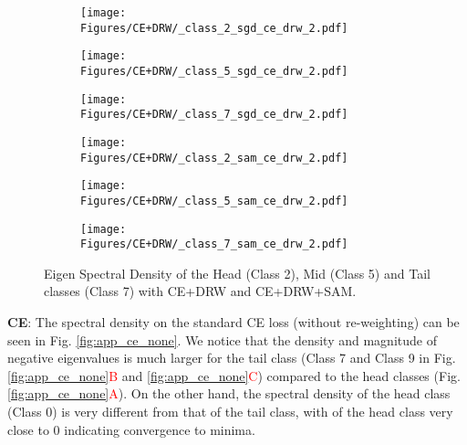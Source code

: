 \documentclass{article}
\begin{document}
\begin{figure}[t]
\begin{subfigure}{.33\textwidth}
  \centering
  \texttt{[image: Figures/CE+DRW/\_class\_2\_sgd\_ce\_drw\_2.pdf]}  

  \label{fig:sub-first4}
\end{subfigure}
\begin{subfigure}{.33\textwidth}
  \centering
  \texttt{[image: Figures/CE+DRW/\_class\_5\_sgd\_ce\_drw\_2.pdf]}  

  \label{fig:sub-second6}
\end{subfigure}
\begin{subfigure}{.33\textwidth}
  \centering
  \texttt{[image: Figures/CE+DRW/\_class\_7\_sgd\_ce\_drw\_2.pdf]}  

  \label{fig:sub-second7}
\end{subfigure}
\newline

\begin{subfigure}{.33\textwidth}
  \centering
  \texttt{[image: Figures/CE+DRW/\_class\_2\_sam\_ce\_drw\_2.pdf]}  

  \label{fig:sub-third2}
\end{subfigure}
\begin{subfigure}{.33\textwidth}
  \centering
  \texttt{[image: Figures/CE+DRW/\_class\_5\_sam\_ce\_drw\_2.pdf]}  

  \label{fig:sub-fourth1}
\end{subfigure}
\begin{subfigure}{.33\textwidth}
  \centering
  \texttt{[image:     Figures/CE+DRW/\_class\_7\_sam\_ce\_drw\_2.pdf]}  

  \label{fig:sub-second9}
\end{subfigure}
\caption{Eigen Spectral Density of the Head (Class 2), Mid (Class 5) and Tail classes (Class 7) with CE+DRW and CE+DRW+SAM.}
\label{fig:app_head-tail-esd}
\vspace{-1.5em}
\end{figure}

\textbf{CE}: The spectral density on the standard CE loss (without re-weighting) can be seen in Fig. \ref{fig:app_ce_none}. We notice that the density and magnitude of negative eigenvalues is much larger for the tail class (Class 7 and Class 9 in Fig. \ref{fig:app_ce_none}\textcolor{red}{B} and \ref{fig:app_ce_none}\textcolor{red}{C}) compared to the head classes (Fig. \ref{fig:app_ce_none}\textcolor{red}{A}). On the other hand, the spectral density of the head class (Class 0) is very different from that of the tail class, with  of the head class very close to 0 indicating convergence to minima.  
\end{document}
